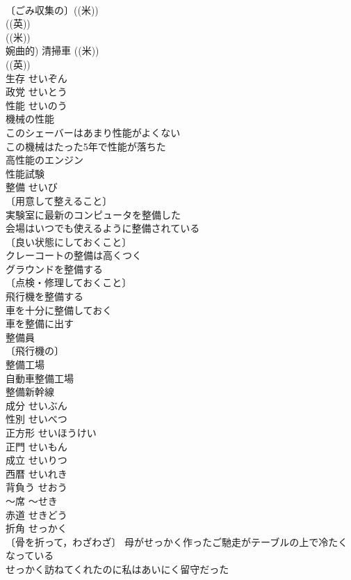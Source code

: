 \documentclass[8pt]{extreport}
\begin{document}
\begin{CJK}{UTF8}{min}
\\	〔ごみ収集の〕((米)) 
\\	((英)) 
\\	((米)) 
\\	婉曲的) 清掃車 ((米)) 
\\	((英)) 
\\	生存	せいぞん	
\\	政党	せいとう	
\\	性能	せいのう	
\\	機械の性能 
\\	このシェーバーはあまり性能がよくない 
\\	この機械はたった5年で性能が落ちた 
\\	高性能のエンジン 
\\	性能試験 
\\	整備	せいび	
\\	〔用意して整えること〕
\\	実験室に最新のコンピュータを整備した 
\\	会場はいつでも使えるように整備されている 
\\	〔良い状態にしておくこと〕
\\	クレーコートの整備は高くつく 
\\	グラウンドを整備する 
\\	〔点検・修理しておくこと〕
\\	飛行機を整備する 
\\	車を十分に整備しておく 
\\	車を整備に出す 
\\	整備員 
\\	〔飛行機の〕
\\	整備工場 
\\	自動車整備工場 
\\	整備新幹線 
\\	成分	せいぶん	
\\	性別	せいべつ	
\\	正方形	せいほうけい	
\\	正門	せいもん	
\\	成立	せいりつ	
\\	西暦	せいれき	
\\	背負う	せおう	
\\	～席	～せき	
\\	赤道	せきどう	
\\	折角	せっかく	
\\	〔骨を折って，わざわざ〕 母がせっかく作ったご馳走がテーブルの上で冷たくなっている 
\\	せっかく訪ねてくれたのに私はあいにく留守だった 

\end{CJK}
\end{document}
